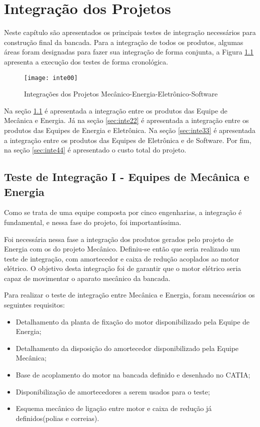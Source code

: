 \chapter[Integração dos Projetos]{Integração dos Projetos}
\label{chap:inte}
	
	Neste capítulo são apresentados os principais testes de integração necessários para construção final da bancada. Para a integração de todos os produtos, algumas áreas foram designadas para fazer sua integração de forma conjunta, a Figura \ref{inte00} apresenta a execução dos testes de forma cronológica.

	\begin{figure}[htpb]
		\centering
		\texttt{[image: inte00]}
		\caption{Integrações dos Projetos Mecânico-Energia-Eletrônico-Software}
		\label{inte00}
	\end{figure}

	Na seção \ref{sec:inte11} é apresentada a integração entre os produtos das Equipe de Mecânica e Energia. Já na seção \ref{sec:inte22} é apresentada a integração entre os produtos das Equipes de Energia e Eletrônica. Na seção \ref{sec:inte33} é apresentada a integração entre os produtos das Equipes de Eletrônica e de Software. Por fim, na seção \ref{sec:inte44} é apresentado o custo total do projeto.

	\section{Teste de Integração I - Equipes de Mecânica e Energia}
	\label{sec:inte11}

		Como se trata de uma equipe composta por cinco engenharias, a integração é fundamental, e nessa fase do projeto, foi importantíssima. 
		
		Foi necessária nessa fase a integração dos produtos gerados pelo projeto de Energia com os do projeto Mecânico. Definiu-se então que seria realizado um teste de integração, com amortecedor e caixa de redução acoplados ao motor elétrico. O objetivo desta integração foi de garantir que o motor elétrico seria capaz de movimentar o aparato mecânico da bancada.
		
		Para realizar o teste de integração entre Mecânica e Energia, foram necessários os seguintes requisitos:

		\begin{itemize}
			\item Detalhamento da planta de fixação do motor disponibilizado pela Equipe de Energia;
			\item Detalhamento da disposição do amortecedor disponibilizado pela Equipe Mecânica;
			\item Base de acoplamento do motor na bancada definido e desenhado no CATIA; 
			\item Disponibilização de amortecedores a serem usados para o teste;
			\item Esquema mecânico de ligação entre motor e caixa de redução já definidos(polias e correias).
		\end{itemize}

